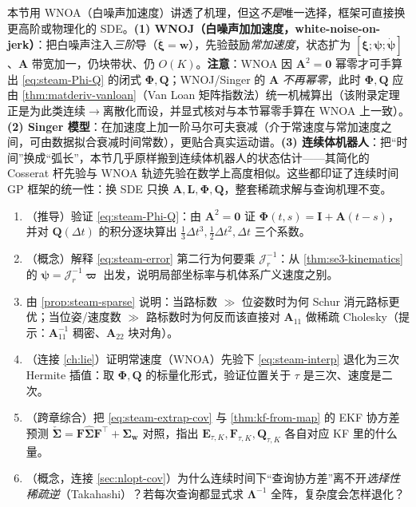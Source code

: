 \begin{insight}[同一框架的高阶与跨域推广]
本节用 WNOA（白噪声加速度）讲透了机理，但这\emph{不是}唯一选择，框架可直接换更高阶或物理化的 SDE。\textbf{(1) WNOJ（白噪声加加速度，white-noise-on-jerk）}\cite{tang2019wnoj}：把白噪声注入\emph{三阶}导（$\dddot{\boldsymbol{\xi}}=\mathbf{w}$），先验鼓励\emph{常加速度}，状态扩为 $[\boldsymbol{\xi};\boldsymbol{\psi};\dot{\boldsymbol{\psi}}]$、$\mathbf{A}$ 带宽加一，仍块带状、仍 $O(K)$。\textbf{注意}：WNOA 因 $\mathbf{A}^2=\mathbf{0}$ 幂零才可手算出 \cref{eq:steam-Phi-Q} 的闭式 $\boldsymbol{\Phi},\mathbf{Q}$；WNOJ/Singer 的 $\mathbf{A}$ \emph{不再幂零}，此时 $\boldsymbol{\Phi},\mathbf{Q}$ 应由 \cref{thm:matderiv-vanloan}（Van Loan 矩阵指数法）统一机械算出（该附录定理正是为此类连续$\to$离散化而设，并显式核对与本节幂零手算在 WNOA 上一致）。\textbf{(2) Singer 模型}\cite{wong2020singer}：在加速度上加一阶马尔可夫衰减（介于常速度与常加速度之间，可由数据拟合衰减时间常数），更贴合真实运动谱。\textbf{(3) 连续体机器人}\cite{lilge2022continuum}：把“时间”换成“弧长”，本节几乎原样搬到连续体机器人的状态估计——其简化的 Cosserat 杆先验与 WNOA 轨迹先验在数学上高度相似。这些都印证了连续时间 GP 框架的统一性：换 SDE 只换 $\mathbf{A},\mathbf{L},\boldsymbol{\Phi},\mathbf{Q}$，整套稀疏求解与查询机理不变。
\end{insight}

\begin{practice}
\begin{enumerate}
  \item （推导）验证 \cref{eq:steam-Phi-Q}：由 $\mathbf{A}^2=\mathbf{0}$ 证 $\boldsymbol{\Phi}(t,s)=\mathbf{I}+\mathbf{A}(t-s)$，并对 $\mathbf{Q}(\Delta t)$ 的积分逐块算出 $\tfrac13\Delta t^3,\tfrac12\Delta t^2,\Delta t$ 三个系数。
  \item （概念）解释 \cref{eq:steam-error} 第二行为何要乘 $\boldsymbol{\mathcal{J}}_r^{-1}$：从 \cref{thm:se3-kinematics} 的 $\boldsymbol{\psi}=\boldsymbol{\mathcal{J}}_r^{-1}\boldsymbol{\varpi}$ 出发，说明局部坐标率与机体系广义速度之别。
  \item 由 \cref{prop:steam-sparse} 说明：当路标数 $\gg$ 位姿数时为何 Schur 消元路标更优；当位姿/速度数 $\gg$ 路标数时为何反而该直接对 $\mathbf{A}_{11}$ 做稀疏 Cholesky（提示：$\mathbf{A}_{11}^{-1}$ 稠密、$\mathbf{A}_{22}$ 块对角）。
  \item （连接 \cref{ch:lie}）证明常速度（WNOA）先验下 \cref{eq:steam-interp} 退化为三次 Hermite 插值：取 $\boldsymbol{\Phi},\mathbf{Q}$ 的标量化形式，验证位置关于 $\tau$ 是三次、速度是二次。
  \item （跨章综合）把 \cref{eq:steam-extrap-cov} 与 \cref{thm:kf-from-map} 的 EKF 协方差预测 $\check{\boldsymbol{\Sigma}}=\mathbf{F}\hat{\boldsymbol{\Sigma}}\mathbf{F}^\top+\boldsymbol{\Sigma}_{\mathbf{w}}$ 对照，指出 $\mathbf{E}_{\tau,K},\mathbf{F}_{\tau,K},\mathbf{Q}_{\tau,K}$ 各自对应 KF 里的什么量。
  \item （概念，连接 \cref{sec:nlopt-cov}）为什么连续时间下“查询协方差”离不开\emph{选择性稀疏逆}（Takahashi）？若每次查询都显式求 $\boldsymbol{\Lambda}^{-1}$ 全阵，复杂度会怎样退化？
\end{enumerate}
\end{practice}

